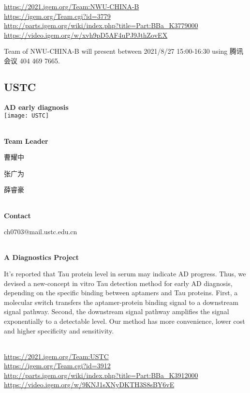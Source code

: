 \url{https://2021.igem.org/Team:NWU-CHINA-B }\\
\url{https://igem.org/Team.cgi?id=3779 }\\
\url{http://parts.igem.org/wiki/index.php?title=Part:BBa_K3779000 }\\
\url{https://video.igem.org/w/xvh9pD5AF4uPJ9JthZovEX }\\

\vfill{}









Team of NWU-CHINA-B will present between  2021/8/27 15:00-16:30       using 腾讯会议 404 469 7665.
\newpage


\subsection{\textcolor{Blu}{ USTC } }
\vspace{5mm}
\begin{center}
\large{
  \textbf{ AD early diagnosis }\\
  \texttt{[image: USTC]}
}
\end{center}
\textbf{\\Team Leader}

  曹耀中

  张广为

  薛睿豪


\textbf{\\Contact}

  ch0703@mail.ustc.edu.cn


\textbf{\\A Diagnostics Project\\}\begin{spacing}{1.5}

It’s reported that Tau protein level in serum may indicate AD progress. Thus, we devised a new-concept in vitro Tau detection method for early AD diagnosis, depending on the specific binding between aptamers and Tau proteins. First, a molecular switch transfers the aptamer-protein binding signal to a downstream signal pathway. Second, the downstream signal pathway amplifies the signal exponentially to a detectable level. Our method has more convenience, lower cost and higher specificity and sensitivity.\end{spacing}
\\

\url{https://2021.igem.org/Team:USTC }\\
\url{https://igem.org/Team.cgi?id=3912 }\\
\url{http://parts.igem.org/wiki/index.php?title=Part:BBa_K3912000 }\\
\url{https://video.igem.org/w/9KNJ1sXNyDKTH3S8sBY6vE }\\

